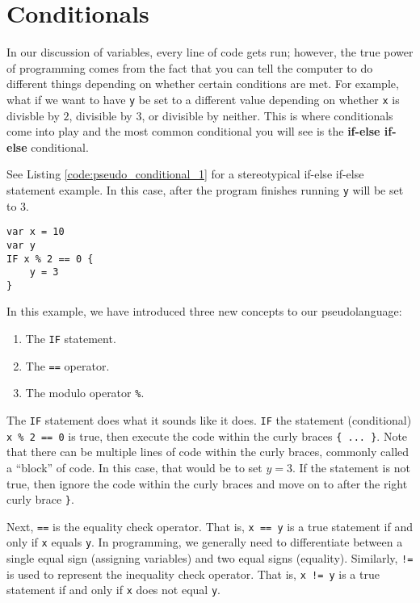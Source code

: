 \documentclass{article}
\begin{document}
\section{Conditionals}

In our discussion of variables, every line of code gets run; however, the true power of programming comes from the fact that you can tell the computer to do different things depending on whether certain conditions are met.
For example, what if we want to have \lstinline{y} be set to a different value depending on whether \lstinline{x} is divisble by $2$, divisible by $3$, or divisible by neither.
This is where conditionals come into play and the most common conditional you will see is the \textbf{if-else if-else} conditional.

See Listing \ref{code:pseudo_conditional_1} for a stereotypical if-else if-else statement example.
In this case, after the program finishes running \lstinline{y} will be set to $3$.
\begin{lstlisting}[caption={A stereotypical IF statement.}, label={code:pseudo_conditional_1}]
var x = 10
var y
IF x % 2 == 0 {
    y = 3
}
\end{lstlisting}
In this example, we have introduced three new concepts to our pseudolanguage:
\begin{enumerate}
\item The \lstinline{IF} statement.
\item The \lstinline{==} operator.
\item The modulo operator \lstinline{%}.
\end{enumerate}
The \lstinline{IF} statement does what it sounds like it does.
\lstinline{IF} the statement (conditional) \lstinline{x % 2 == 0} is true, then execute the code within the curly braces \lstinline|{ ... }|.
Note that there can be multiple lines of code within the curly braces, commonly called a ``block'' of code.
In this case, that would be to set $y = 3$.
If the statement is not true, then ignore the code within the curly braces and move on to after the right curly brace \lstinline|}|.

Next, \lstinline{==} is the equality check operator.
That is, \lstinline{x == y} is a true statement if and only if \lstinline{x} equals \lstinline{y}.
In programming, we generally need to differentiate between a single equal sign (assigning variables) and two equal signs (equality).
Similarly, \lstinline{!=} is used to represent the inequality check operator.
That is, \lstinline{x != y} is a true statement if and only if \lstinline{x} does not equal \lstinline{y}.
\end{document}
